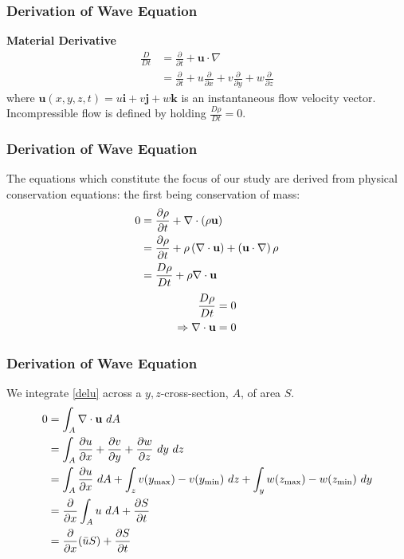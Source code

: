 	\begin{frame}
		\frametitle{Derivation of Wave Equation}
		\textbf{Material Derivative}
		\begin{align*}
			\frac{D}{Dt} &= \frac{\partial}{\partial t} + \textbf{u}\cdot\nabla\\
			&= \frac{\partial}{\partial t} + u\frac{\partial}{\partial x} + v\frac{\partial}{\partial y} + w\frac{\partial}{\partial z}
		\end{align*}
		where $ \textbf{u}(x,y,z,t) = u\textbf{i}+v\textbf{j}+w\textbf{k} $ is an instantaneous flow velocity vector.\\
		Incompressible flow is defined by holding $\frac{D \rho}{D t} = 0$.
	\end{frame}

	\begin{frame}
		\frametitle{Derivation of Wave Equation}
		The equations which constitute the focus of our study are derived from physical conservation equations: the first being conservation of mass:
		\begin{align}
			0 &= \frac{ \partial \rho }{\partial t} + \nabla \cdot ( \rho \textbf{u} )\\
			&= \frac{\partial \rho}{\partial t} + \rho \left( \nabla \cdot \textbf{u} \right) + \left( \textbf{u} \cdot \nabla \right) \rho \notag \\
			&= \frac{D \rho}{D t} + \rho \nabla \cdot \textbf{u} \notag
		\end{align}
		\begin{align}
			\frac{D \rho}{D t} &=0 \notag \\
			\Rightarrow  \nabla \cdot \textbf{u}& = 0 \label{delu}
		\end{align}
	\end{frame}

	\begin{frame}
		\frametitle{Derivation of Wave Equation}
		We integrate \eqref{delu} across a $y,z$-cross-section, $A$, of area $S$.
		\begin{align}
			0 &= \int_{A} \nabla \cdot \textbf{u} \ dA \notag\\
			&= \int_{A} \frac{\partial u}{\partial x} + \frac{\partial v}{\partial y} + \frac{\partial w}{\partial z} \ dy \ dz \notag\\
			&= \int_A \frac{\partial u}{\partial x} \ dA +\int_z v(y_{\max})-v(y_{\min}) \ dz + \int_y w(z_{\max}) - w(z_{\min})\ dy \notag\\
			&= \frac{\partial}{\partial x} \int_A u \ dA + \frac{\partial S}{\partial t} \notag\\
			\label{swe1} &= \frac{\partial}{\partial x} (\bar{u}S) +  \frac{\partial S}{\partial t}
		\end{align}
	\end{frame}

